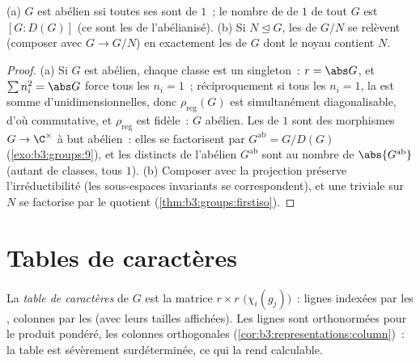 \begin{proposition}
\label{prop:b3:representations:onedim}
(a) $G$ est abélien ssi toutes ses  sont de  $1$~; le nombre de  de
 $1$ de tout $G$ est $[G : D(G)]$ (ce sont les 
de l'abélianisé).
(b) Si $N \trianglelefteq G$, les 
de $G/N$ se relèvent (composer avec $G \to G/N$) en
exactement les  de $G$ dont le
noyau contient $N$.
\end{proposition}

\begin{proof}
(a) Si $G$ est abélien, chaque classe est un singleton~: $r =
\abs G$, et $\sum n_i^2 = \abs G$ force tous les $n_i = 1$~;
réciproquement si tous les $n_i = 1$, la  est somme d'unidimensionnelles, donc
$\rho_{\mathrm{reg}}(G)$ est simultanément diagonalisable,
d'où commutative, et $\rho_{\mathrm{reg}}$ est fidèle~: $G$
abélien. Les  de  $1$ sont des morphismes
$G \to \C^\times$ à but abélien~: elles se factorisent par
$G^{\mathrm{ab}} = G/D(G)$ (\cref{exo:b3:groups:9}), et les
 distincts de l'abélien $G^{\mathrm{ab}}$ sont au
nombre de $\abs{G^{\mathrm{ab}}}$ (autant de classes, tous
 $1$). (b) Composer avec la projection préserve
l'irréductibilité (les sous-espaces invariants se
correspondent), et une  triviale sur $N$ se
factorise par le quotient (\cref{thm:b3:groups:firstiso}).
\end{proof}

\section{Tables de caractères}

\begin{definition}\label{def:b3:representations:table}
La \emph{table de caractères} de $G$
est la matrice $r \times r$ $\bigl(\chi_i(g_j)\bigr)$~: lignes
indexées par les  , colonnes par les
 (avec leurs tailles affichées). Les
lignes sont orthonormées pour le produit pondéré, les colonnes
orthogonales (\cref{cor:b3:representations:column})~: la table
est sévèrement surdéterminée, ce qui la rend calculable.
\end{definition}

